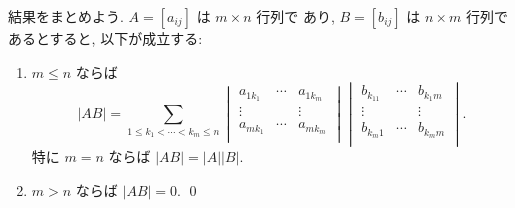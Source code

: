 \documentclass[12pt,twoside]{jarticle}
\begin{document}
\begin{rem}[長方形型の行列の積の行列式]
  結果をまとめよう. $A=[a_{ij}]$ は $m\times n$ 行列で
  あり, $B=[b_{ij}]$ は $n\times m$ 行列であるとすると, 
  以下が成立する:
  \begin{enumerate}
  \item $m\le n$ ならば
    \begin{equation*}
      |AB| = 
      \sum_{1\le k_1<\cdots<k_m\le n}
      \begin{vmatrix}
        a_{1k_1} & \cdots & a_{1k_m} \\
        \vdots   &        & \vdots   \\
        a_{mk_1} & \cdots & a_{mk_m} \\
      \end{vmatrix}
      \begin{vmatrix}
        b_{k_11} & \cdots & b_{k_1m} \\
        \vdots   &        & \vdots   \\
        b_{k_m1} & \cdots & b_{k_mm} \\
      \end{vmatrix}.
    \end{equation*}
    特に $m=n$ ならば $|AB|=|A||B|$.
  \item $m>n$ ならば $|AB|=0$.
    \qed
  \end{enumerate}
\end{rem}

\end{document}
